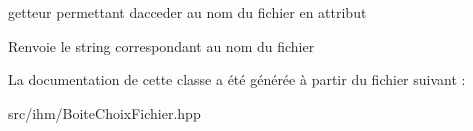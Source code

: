 getteur permettant d\textquotesingle{}acceder au nom du fichier en attribut 

\begin{DoxyReturn}{Renvoie}
le string correspondant au nom du fichier 
\end{DoxyReturn}


La documentation de cette classe a été générée à partir du fichier suivant \+:\begin{DoxyCompactItemize}
\item 
src/ihm/Boite\+Choix\+Fichier.\+hpp\end{DoxyCompactItemize}
